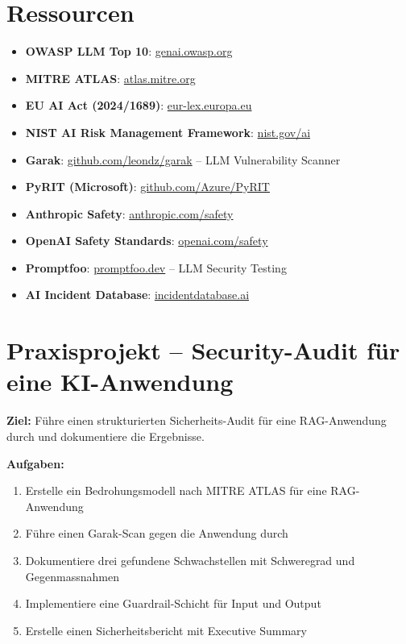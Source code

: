 \section{Ressourcen}

\begin{itemize}[leftmargin=*]
    \item \textbf{OWASP LLM Top 10}: \href{https://genai.owasp.org}{genai.owasp.org}
    \item \textbf{MITRE ATLAS}: \href{https://atlas.mitre.org}{atlas.mitre.org}
    \item \textbf{EU AI Act (2024/1689)}: \href{https://eur-lex.europa.eu/eli/reg/2024/1689}{eur-lex.europa.eu}
    \item \textbf{NIST AI Risk Management Framework}: \href{https://www.nist.gov/ai}{nist.gov/ai}
    \item \textbf{Garak}: \href{https://github.com/leondz/garak}{github.com/leondz/garak} -- LLM Vulnerability Scanner
    \item \textbf{PyRIT (Microsoft)}: \href{https://github.com/Azure/PyRIT}{github.com/Azure/PyRIT}
    \item \textbf{Anthropic Safety}: \href{https://anthropic.com/safety}{anthropic.com/safety}
    \item \textbf{OpenAI Safety Standards}: \href{https://openai.com/safety}{openai.com/safety}
    \item \textbf{Promptfoo}: \href{https://www.promptfoo.dev}{promptfoo.dev} -- LLM Security Testing
    \item \textbf{AI Incident Database}: \href{https://incidentdatabase.ai}{incidentdatabase.ai}
\end{itemize}

\section{Praxisprojekt -- Security-Audit für eine KI-Anwendung}

\textbf{Ziel:} Führe einen strukturierten Sicherheits-Audit für eine RAG-Anwendung durch und dokumentiere die Ergebnisse.

\textbf{Aufgaben:}
\begin{enumerate}[leftmargin=*]
    \item Erstelle ein Bedrohungsmodell nach MITRE ATLAS für eine RAG-Anwendung
    \item Führe einen Garak-Scan gegen die Anwendung durch
    \item Dokumentiere drei gefundene Schwachstellen mit Schweregrad und Gegenmassnahmen
    \item Implementiere eine Guardrail-Schicht für Input und Output
    \item Erstelle einen Sicherheitsbericht mit Executive Summary
\end{enumerate}

